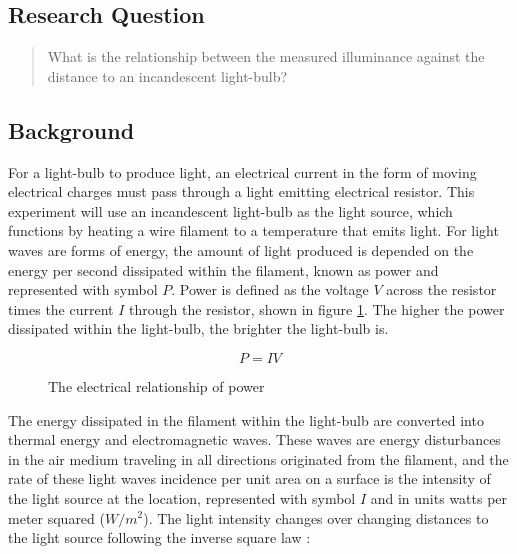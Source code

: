 \documentclass[a4paper,12pt]{article}
\begin{document}
\subsection{Research Question}
\begin{quote}
 What is the relationship between the measured illuminance against the distance to an incandescent light-bulb?
\end{quote}

\subsection{Background}

For a light-bulb to produce light, an electrical current in the form of moving electrical charges must  pass through a light emitting electrical resistor. This experiment will use an incandescent light-bulb as the light source, which functions by heating a wire filament to a temperature that emits light. For light waves are forms of energy, the amount of light produced is depended on the energy per second dissipated within the filament, known as power and represented with symbol $P$. Power is defined as the voltage $V$ across the resistor times the current $I$ through the resistor, shown in figure \ref{eq:work}. The higher the power dissipated within the light-bulb, the brighter the light-bulb is.



\begin{figure}[H]
    \[
    P = IV
    \]
    \caption{The electrical relationship of power}
    \label{eq:work}
\end{figure}

The energy dissipated in the filament within the light-bulb are converted into thermal energy and electromagnetic waves. These waves are energy disturbances in the air medium traveling in all directions originated from the filament, and the rate of these light waves incidence per unit area on a surface is the intensity of the light source at the location, represented with symbol $I$ and in units watts per meter squared ($\si{W/m^2}$). The light intensity changes over changing distances to the light source following the inverse square law \parencite{isl}:
\end{document}
